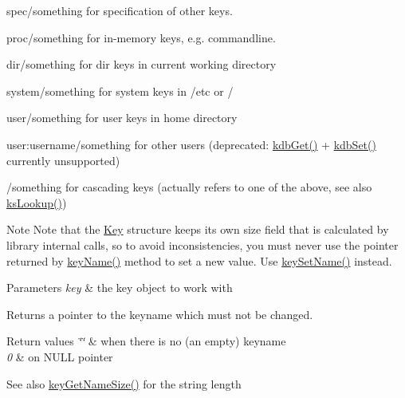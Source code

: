 \begin{DoxyItemize}
\item {\ttfamily spec/something} for specification of other keys.
\item {\ttfamily proc/something} for in-\/memory keys, e.\+g. commandline.
\item {\ttfamily dir/something} for dir keys in current working directory
\item {\ttfamily system/something} for system keys in /etc or /
\item {\ttfamily user/something} for user keys in home directory
\item {\ttfamily user\+:username/something} for other users (deprecated\+: \hyperlink{group__kdb_ga28e385fd9cb7ccfe0b2f1ed2f62453a1}{kdb\+Get()} + \hyperlink{group__kdb_ga11436b058408f83d303ca5e996832bcf}{kdb\+Set()} currently unsupported)
\item {\ttfamily /something} for cascading keys (actually refers to one of the above, see also \hyperlink{group__keyset_gaa34fc43a081e6b01e4120daa6c112004}{ks\+Lookup()})

\begin{DoxyNote}{Note}
Note that the \hyperlink{classkdb_1_1Key}{Key} structure keeps its own size field that is calculated by library internal calls, so to avoid inconsistencies, you must never use the pointer returned by \hyperlink{group__keyname_ga8e805c726a60da921d3736cda7813513}{key\+Name()} method to set a new value. Use \hyperlink{group__keyname_ga7699091610e7f3f43d2949514a4b35d9}{key\+Set\+Name()} instead.
\end{DoxyNote}

\begin{DoxyParams}{Parameters}
{\em key} & the key object to work with \\
\hline
\end{DoxyParams}
\begin{DoxyReturn}{Returns}
a pointer to the keyname which must not be changed. 
\end{DoxyReturn}

\begin{DoxyRetVals}{Return values}
{\em \char`\"{}\char`\"{}} & when there is no (an empty) keyname \\
\hline
{\em 0} & on N\+U\+LL pointer \\
\hline
\end{DoxyRetVals}
\begin{DoxySeeAlso}{See also}
\hyperlink{group__keyname_gabdbcfa51ed8a387e47ead207affa2d2e}{key\+Get\+Name\+Size()} for the string length 


\end{DoxySeeAlso}
\end{DoxyItemize}
